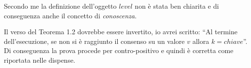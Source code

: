 \documentclass[11pt]{article}
\begin{document}
\theform
\begin{formalreport}
  Secondo me la definizione dell'oggetto $level$ non \`e stata ben
  chiarita e di conseguenza anche il concetto di \emph{conoscenza}.

  Il verso del Teorema 1.2 dovrebbe essere invertito, io avrei
  scritto: ``Al termine dell'esecuzione, se non si \`e raggiunto il
  consenso su un valore $v$ allora $k = chiave$''. Di conseguenza la
  prova procede per contro-positivo e quindi \`e corretta come
  riportata nelle dispense.
\end{formalreport}
\end{document}
